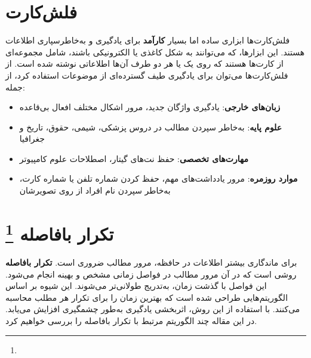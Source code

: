 \documentclass[12pt]{report}
\begin{document}
\section{فلش‌کارت}
فلش‌کارت‌ها ابزاری ساده اما بسیار 
\textbf{کارآمد}
برای یادگیری و به‌خاطرسپاری اطلاعات هستند. این ابزارها، که می‌توانند به شکل 
کاغذی یا الکترونیکی باشند، شامل مجموعه‌ای از کارت‌ها هستند
 که روی یک یا هر دو طرف آن‌ها اطلاعاتی نوشته شده است. از فلش‌کارت‌ها 
می‌توان برای یادگیری طیف گسترده‌ای از موضوعات استفاده کرد، از جمله:

\begin{itemize}
  \item \textbf{زبان‌های خارجی}: یادگیری واژگان جدید، مرور اشکال مختلف افعال بی‌قاعده
  \item \textbf{علوم پایه}: به‌خاطر سپردن مطالب در دروس پزشکی، شیمی، حقوق، تاریخ و جغرافیا
  \item \textbf{مهارت‌های تخصصی}: حفظ نت‌های گیتار، اصطلاحات علوم کامپیوتر
  \item \textbf{موارد روزمره}: مرور یادداشت‌های مهم، حفظ کردن شماره تلفن یا شماره کارت، به‌خاطر سپردن نام افراد از روی تصویرشان
\end{itemize}

\section{تکرار بافاصله
\protect\footnote{}
}

برای ماندگاری بیشتر اطلاعات در حافظه، مرور مطالب ضروری است.
\textbf{تکرار بافاصله}
 روشی است که در آن مرور مطالب در فواصل زمانی مشخص و بهینه انجام می‌شود.
  این فواصل با گذشت زمان،
  به‌تدریج طولانی‌تر می‌شوند. 
 این شیوه بر اساس الگوریتم‌هایی 
 طراحی شده است که بهترین زمان را
  برای تکرار هر مطلب محاسبه می‌کنند. 
 با استفاده از این روش، اثربخشی
  یادگیری به‌طور چشمگیری افزایش می‌یابد.\cite{ttk}
 در این مقاله چند الگوریتم مرتبط
  با تکرار بافاصله را 
 بررسی خواهیم کرد.

\end{document}
